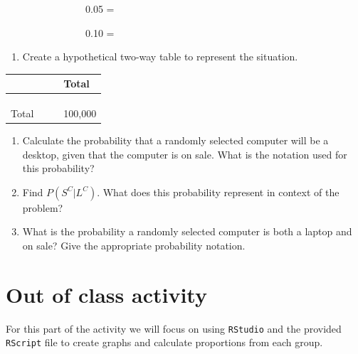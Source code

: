 \documentclass[
]{report}
\providecommand{\tightlist}{%
  \setlength{\itemsep}{0pt}\setlength{\parskip}{0pt}}
\begin{document}
\vspace{.1in}

~~~~~~~~~~~~~~~~0.05 =

\vspace{.1in}

~~~~~~~~~~~~~~~~0.10 =

\vspace{.1in}

\begin{enumerate}
\def\labelenumi{\alph{enumi}.}
\setcounter{enumi}{1}
\tightlist
\item
  Create a hypothetical two-way table to represent the situation.
\end{enumerate}

\begin{longtable}[]{@{}llll@{}}
\toprule
\hspace{1in} & \hspace{1in} & \hspace{1in} & Total\tabularnewline
\midrule
\endhead
\hspace{1in} & & &\tabularnewline
\hspace{1in} & & &\tabularnewline
\hspace{1in} & & &\tabularnewline
Total & & & 100,000\tabularnewline
\bottomrule
\end{longtable}

\begin{enumerate}
\def\labelenumi{\alph{enumi}.}
\setcounter{enumi}{2}
\item
  Calculate the probability that a randomly selected computer will be a desktop, given that the computer is on sale. What is the notation used for this probability?
  \vspace{.8in}
\item
  Find \(P(S^C | L^C)\). What does this probability represent in context of the problem?
  \vspace{1in}
\item
  What is the probability a randomly selected computer is both a laptop and on sale? Give the appropriate probability notation.
  \newpage
\end{enumerate}

\hypertarget{out-of-class-activity}{%
\section{Out of class activity}\label{out-of-class-activity}}

For this part of the activity we will focus on using \texttt{RStudio} and the provided \texttt{RScript} file to create graphs and calculate proportions from each group.
\end{document}
